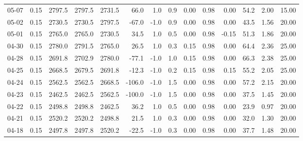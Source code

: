 \begin{threeparttable}
{\begin{tabular}{lrrrrrrrrrrrrr}
  05-07 &     0.15 & 2797.5 & 2797.5 & 2731.5 &       66.0 &                      1.0 &                 0.9 &       0.00 &      0.98 &           0.00 &             54.2 &            2.00 &                  15.00 \\
  05-02 &     0.15 & 2730.5 & 2730.5 & 2797.5 &      -67.0 &                     -1.0 &                 0.9 &       0.00 &      0.98 &           0.00 &             43.5 &            1.56 &                  20.00 \\
  05-01 &     0.15 & 2765.0 & 2765.0 & 2730.5 &       34.5 &                      1.0 &                 0.5 &       0.00 &      0.98 &          -0.15 &             51.3 &            1.86 &                  20.00 \\
  04-30 &     0.15 & 2780.0 & 2791.5 & 2765.0 &       26.5 &                      1.0 &                 0.3 &       0.15 &      0.98 &           0.00 &             64.4 &            2.36 &                  25.00 \\
  04-28 &     0.15 & 2691.8 & 2702.9 & 2780.0 &      -77.1 &                     -1.0 &                 1.0 &       0.15 &      0.98 &           0.00 &             66.3 &            2.38 &                  25.00 \\
  04-25 &     0.15 & 2668.5 & 2679.5 & 2691.8 &      -12.3 &                     -1.0 &                 0.2 &       0.15 &      0.98 &           0.15 &             55.2 &            2.05 &                  25.00 \\
  04-24 &     0.15 & 2562.5 & 2562.5 & 2668.5 &     -106.0 &                     -1.0 &                 1.5 &       0.00 &      0.98 &           0.00 &             57.2 &            2.15 &                  20.00 \\
  04-23 &     0.15 & 2462.5 & 2462.5 & 2562.5 &     -100.0 &                     -1.0 &                 1.5 &       0.00 &      0.98 &           0.00 &             37.5 &            1.45 &                  20.00 \\
  04-22 &     0.15 & 2498.8 & 2498.8 & 2462.5 &       36.2 &                      1.0 &                 0.5 &       0.00 &      0.98 &           0.00 &             23.9 &            0.97 &                  20.00 \\
  04-21 &     0.15 & 2520.2 & 2520.2 & 2498.8 &       21.5 &                      1.0 &                 0.3 &       0.00 &      0.98 &           0.00 &             32.0 &            1.30 &                  20.00 \\
  04-18 &     0.15 & 2497.8 & 2497.8 & 2520.2 &      -22.5 &                     -1.0 &                 0.3 &       0.00 &      0.98 &           0.00 &             37.7 &            1.48 &                  20.00 \\

\end{tabular}}
\end{threeparttable}
